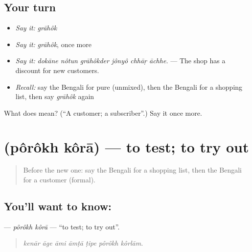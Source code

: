 \subsection*{Your turn}
\begin{itemize}
\raggedright
  \item \emph{Say it:} \emph{grāhôk}
  \item \emph{Say it:} \emph{grāhôk}, once more
  \item \emph{Say it:} \emph{dokāne nôtun grāhôkder jônyô chhāṛ āchhe.} — The shop has a discount for new customers.
  \item \emph{Recall:} say the Bengali for pure (unmixed), then the Bengali for a shopping list, then say \emph{grāhôk} again
\end{itemize}

\begin{tcolorbox}[breakable,colback=teal!4,colframe=teal!35!black,title={Before you move on}]
What does  mean? (\textquotedblleft{}A customer; a subscriber\textquotedblright{}.) Say it once more.
\end{tcolorbox}
\section[\texorpdfstring{\bn{পরখ} \bn{করা} (pôrôkh kôrā)}{পরখ করা (pôrôkh kôrā)}]{  (pôrôkh kôrā) — to test; to try out}

\label{lesson:BN-C422-porokh-kora}



\begin{quote}
Before the new one: say the Bengali for a shopping list, then the Bengali for a customer (formal).
\end{quote}

\subsection*{You'll want to know:  }
\textbf{ } — \emph{pôrôkh kôrā} — \textquotedblleft{}to test; to try out\textquotedblright{}.

\begin{quote}
      
\end{quote}

\begin{quote}
\emph{kenār āge āmi āmṭā ṭipe pôrôkh kôrlām.}
\end{quote}

